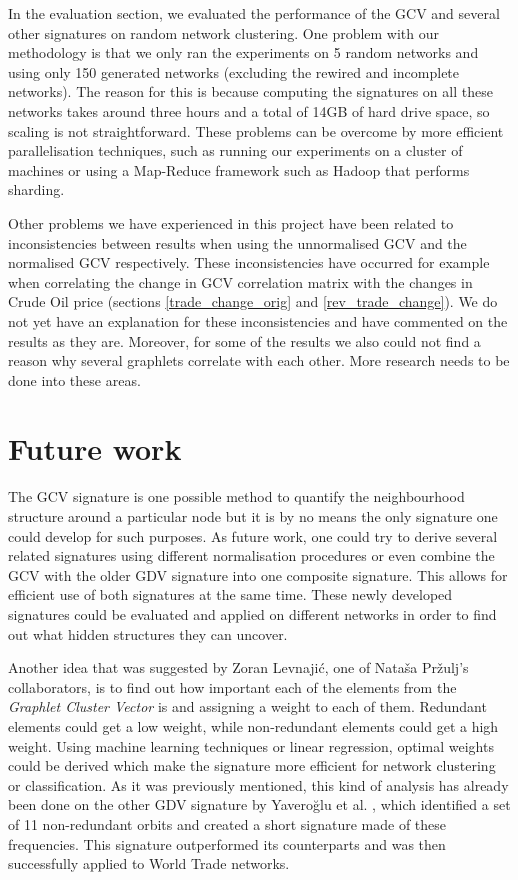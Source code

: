 In the evaluation section, we evaluated the performance of the GCV and several other signatures on random network clustering. One problem with our methodology is that we only ran the experiments on 5 random networks and using only 150 generated networks (excluding the rewired and incomplete networks). The reason for this is because computing the signatures on all these networks takes around three hours and a total of 14GB of hard drive space, so scaling is not straightforward. These problems can be overcome by more efficient parallelisation techniques, such as running our experiments on a cluster of machines or using a Map-Reduce framework such as Hadoop that performs sharding.

Other problems we have experienced in this project have been related to inconsistencies between results when using the unnormalised GCV and the normalised GCV respectively. These inconsistencies have occurred for example when correlating the change in GCV correlation matrix with the changes in Crude Oil price (sections \ref{trade_change_orig} and \ref{rev_trade_change}). We do not yet have an explanation for these inconsistencies and have commented on the results as they are. Moreover, for some of the results we also could not find a reason why several graphlets correlate with each other. More research needs to be done into these areas.

\section{Future work}

The GCV signature is one possible method to quantify the neighbourhood structure around a particular node but it is by no means the only signature one could develop for such purposes. As future work, one could try to derive several related signatures using different normalisation procedures or even combine the GCV with the older GDV signature into one composite signature. This allows for efficient use of both signatures at the same time. These newly developed signatures could be evaluated and applied on different networks in order to find out what hidden structures they can uncover. 

Another idea that was suggested by Zoran Levnaji\'{c}, one of Nata\v{s}a Pr\v{z}ulj's collaborators, is to find out how important each of the elements from the \emph{Graphlet Cluster Vector} is and assigning a weight to each of them. Redundant elements could get a low weight, while non-redundant elements could get a high weight. Using machine learning techniques or linear regression, optimal weights could be derived which make the signature more efficient for network clustering or classification. As it was previously mentioned, this kind of analysis has already been done on the other GDV signature by Yavero\u{g}lu et al. \cite{yaverouglu2014revealing}, which identified a set of 11 non-redundant orbits and created a short signature made of these frequencies. This signature outperformed its counterparts and was then successfully applied to World Trade networks. 

